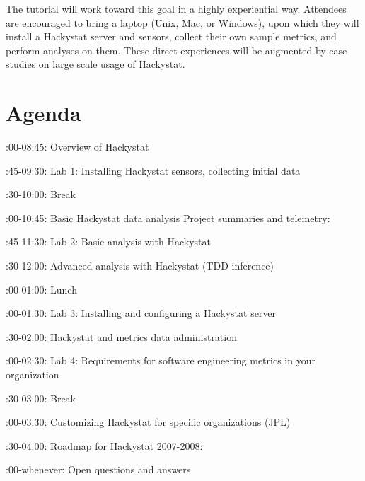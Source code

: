 \documentclass[runningheads]{llncs}
\begin{document}
The tutorial will work toward this goal in a highly experiential way.
Attendees are encouraged to bring a laptop (Unix, Mac, or Windows), upon
which they will install a Hackystat server and sensors, collect their own
sample metrics, and perform analyses on them. These direct experiences will
be augmented by case studies on large scale usage of Hackystat.





\newpage

\section{Agenda}

:00-08:45: Overview of  Hackystat

\bigskip 
{}:45-09:30: Lab 1: Installing Hackystat sensors, collecting initial data

\bigskip 
{}:30-10:00: Break

\bigskip 
{}:00-10:45: Basic Hackystat data analysis Project summaries and telemetry:

\bigskip 
{}:45-11:30: Lab 2: Basic analysis with Hackystat

\bigskip 
{}:30-12:00: Advanced analysis with Hackystat (TDD inference)

\bigskip 
{}:00-01:00: Lunch

\bigskip 
{}:00-01:30: Lab 3: Installing and configuring a Hackystat server

\bigskip 
{}:30-02:00: Hackystat and metrics data administration

\bigskip 
{}:00-02:30: Lab 4: Requirements for software engineering metrics in your organization

\bigskip 
{}:30-03:00: Break

\bigskip 
{}:00-03:30: Customizing Hackystat for specific organizations (JPL) 

\bigskip 
{}:30-04:00: Roadmap for Hackystat 2007-2008:

\bigskip 
{}:00-whenever: Open questions and answers
\end{document}
